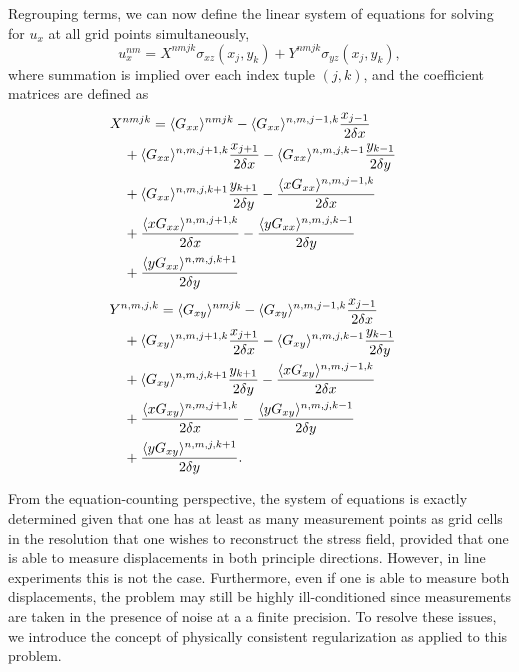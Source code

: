 \documentclass[aps,prl,reprint,twocolumn,groupedaddress,showpacs]{revtex4-1}
\begin{document}
Regrouping terms, we can now define the linear system of equations for solving for $u_x$ at all grid points simultaneously,
\begin{equation}
u_x^{nm} = X^{nmjk}\sigma_{xz}(x_j,y_k) + Y^{nmjk}\sigma_{yz}(x_j,y_k),
\label{eq:linearsystem1}
\end{equation}
where summation is implied over each index tuple $(j,k)$, and the coefficient matrices are defined as
\begin{align}
\lefteqn{X^{nmjk} = \langle G_{xx} \rangle^{nmjk} -  \langle G_{xx} \rangle^{n,m,j-1,k}\frac{x_{j-1}}{2\delta x} } \nonumber\\
&\quad  + \langle G_{xx} \rangle^{n,m,j+1,k}\frac{x_{j+1}}{2\delta x} -  \langle G_{xx} \rangle^{n,m,j,k-1}\frac{y_{k-1}}{2\delta y}  \nonumber\\
&\quad + \langle G_{xx} \rangle^{n,m,j,k+1}\frac{y_{k+1}}{2\delta y} -\frac{\langle xG_{xx} \rangle^{n,m,j-1,k}}{2\delta x}  \nonumber\\
&\quad +\frac{\langle xG_{xx} \rangle^{n,m,j+1,k}}{2\delta x} - \frac{\langle yG_{xx} \rangle^{n,m,j,k-1}}{2\delta y} \nonumber\\
&\quad+\frac{\langle yG_{xx} \rangle^{n,m,j,k+1}}{2\delta y} \label{eq:linearsystemX}
\end{align}
\begin{align}
\lefteqn{ Y^{n,m,j,k} =  \langle G_{xy} \rangle^{nmjk} - \langle G_{xy} \rangle^{n,m,j-1,k}\frac{x_{j-1}}{2\delta x} } \nonumber\\
&\quad+\langle G_{xy} \rangle^{n,m,j+1,k}\frac{x_{j+1}}{2\delta x} - \langle G_{xy} \rangle^{n,m,j,k-1}\frac{y_{k-1}}{2\delta y} \nonumber\\
&\quad+\langle G_{xy} \rangle^{n,m,j,k+1}\frac{y_{k+1}}{2\delta y}  -\frac{\langle xG_{xy} \rangle^{n,m,j-1,k}}{2\delta x} \nonumber \\
&\quad +\frac{\langle xG_{xy} \rangle^{n,m,j+1,k}}{2\delta x} - \frac{\langle yG_{xy} \rangle^{n,m,j,k-1}}{2\delta y} \nonumber\\
 &\quad+\frac{\langle yG_{xy} \rangle^{n,m,j,k+1}}{2\delta y}.\label{eq:linearsystemY}
\end{align}


From the equation-counting perspective, the system of equations is exactly determined given that one has at least as many measurement points as grid cells in the resolution that one wishes to reconstruct the stress field, provided that one is able to measure displacements in both principle directions. However, in line experiments this is not the case. Furthermore, even if one is able to measure both displacements, the problem may still be highly ill-conditioned since measurements are taken in the presence of noise at a a finite precision. To resolve these issues, we introduce  the concept of physically consistent regularization as applied to this problem.
\end{document}
